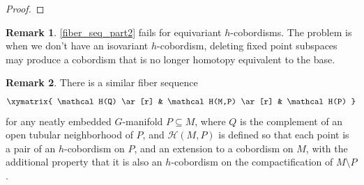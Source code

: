 \documentclass[11pt]{amsart}
\theoremstyle{definition}
\newtheorem{rem}{Remark}[section]
\numberwithin{equation}{section}
\numberwithin{figure}{section}
\newcommand{\ti}{\widetilde}
\newcommand{\mc}{\mathcal}
\begin{document}
\begin{proof}
%	
%	
\end{proof}


\begin{rem}
	\autoref{fiber_seq_part2} fails for equivariant $h$-cobordisms. The problem is when we don't have an isovariant $h$-cobordism, deleting fixed point subspaces may produce a cobordism that is no longer homotopy equivalent to the base.
\end{rem}

\begin{rem}
	There is a similar fiber sequence
	\[ \xymatrix{ \mc H(Q) \ar[r] & \mc H(M,P) \ar[r] & \mc H(P) } \]
	for any neatly embedded $G$-manifold $P \subseteq M$, where $Q$ is the complement of an open tubular neighborhood of $P$, and $\mc H(M,P)$ is defined so that each point is a pair of an $h$-cobordism on $P$, and an extension to a cobordism on $M$, with the additional property that it is also an $h$-cobordism on the compactification of $M \setminus P$.
\end{rem}
\end{document}
